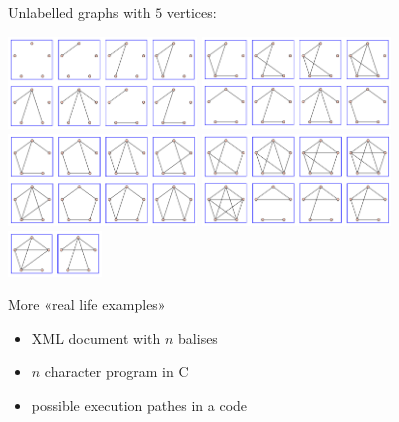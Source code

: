 \documentclass[compress,11pt]{beamer}
\begin{document}
\begin{frame}{Unlabelled graphs with $5$ vertices:}

  \includegraphics[width=5cm]{media/graphs-5-1.png}
  \includegraphics[width=5cm]{media/graphs-5-2.png}\\
  \includegraphics[width=5cm]{media/graphs-5-3.png}
  \includegraphics[width=5cm]{media/graphs-5-4.png}\\
  \includegraphics[width=2.5cm]{media/graphs-5-5.png}
\end{frame}


\begin{frame}{More «real life examples»}
  \begin{itemize}
  \item XML document with $n$ balises
    \bigskip

  \item $n$ character program in C
    \bigskip

  \item possible execution pathes in a code
  \end{itemize}
\end{frame}
\end{document}
